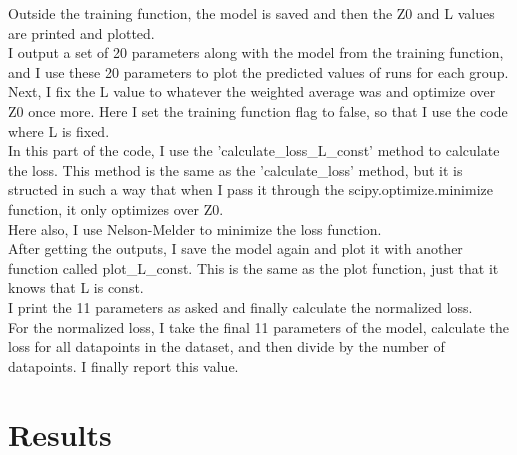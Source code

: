 \documentclass[12pt]{article}
\begin{document}
Outside the training function, the model is saved and then the Z0 and L values are printed and plotted.\\
I output a set of 20 parameters along with the model from the training function, and I use these 20 parameters to plot the predicted values of runs for each group.\\
Next, I fix the L value to whatever the weighted average was and optimize over Z0 once more. Here I set the training function flag to false, so that I use the code where L is fixed.\\
In this part of the code, I use the 'calculate\_loss\_L\_const' method to calculate the loss. This method is the same as the 'calculate\_loss' method, but it is structed in such a way that when I pass it through the scipy.optimize.minimize function, it only optimizes over Z0.\\
Here also, I use Nelson-Melder to minimize the loss function.\\
After getting the outputs, I save the model again and plot it with another function called plot\_L\_const. This is the same as the plot function, just that it knows that L is const.\\
I print the 11 parameters as asked and finally calculate the normalized loss.\\
For the normalized loss, I take the final 11 parameters of the model, calculate the loss for all datapoints in the dataset, and then divide by the number of datapoints. I finally report this value.

\section{Results}
\end{document}
